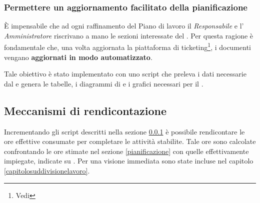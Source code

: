 \subsubsection{Permettere un aggiornamento facilitato della pianificazione}
\label{script}
È impensabile che ad ogni raffinamento del Piano di lavoro il \emph{Responsabile} e l' \emph{Amministratore} riscrivano a mano le sezioni interessate del \PianoDiProgetto.
Per questa ragione è fondamentale che, una volta aggiornata la piattaforma di ticketing\footnote{Vedi \NormeDiProgetto}, i documenti vengano \textbf{aggiornati in modo automatizzato}.

Tale obiettivo è stato implementato con uno script che preleva i dati necessarie dal  e genera le tabelle, i diagrammi di  e i grafici necessari per il \PianoDiProgetto.

\subsection{Meccanismi di rendicontazione}

Incrementando gli script descritti nella sezione \ref{script} è possibile rendicontare le ore effettive consumate per completare le attività stabilite.
Tale ore sono calcolate confrontando le ore stimate nel \PianoDiProgetto{} sezione \ref{pianificazione} con quelle effettivamente impiegate, indicate su .
Per una visione immediata sono state incluse nel capitolo \ref{capitolosuddivisionelavoro}.



